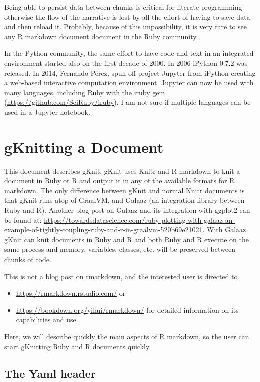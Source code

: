 \documentclass[]{article}
\providecommand{\tightlist}{%
  \setlength{\itemsep}{0pt}\setlength{\parskip}{0pt}}
\begin{document}
Being able to persist data between chunks is critical for literate
programming otherwise the flow of the narrative is lost by all the
effort of having to save data and then reload it. Probably, because of
this impossibility, it is very rare to see any R markdown document
document in the Ruby community.

In the Python community, the same effort to have code and text in an
integrated environment started also on the first decade of 2000. In 2006
iPython 0.7.2 was released. In 2014, Fernando Pérez, spun off project
Jupyter from iPython creating a web-based interactive computation
environment. Jupyter can now be used with many languages, including Ruby
with the iruby gem (\url{https://github.com/SciRuby/iruby}). I am not
sure if multiple languages can be used in a Jupyter notebook.

\section{gKnitting a Document}\label{gknitting-a-document}

This document describes gKnit. gKnit uses Knitr and R markdown to knit a
document in Ruby or R and output it in any of the available formats for
R markdown. The only difference between gKnit and normal Knitr documents
is that gKnit runs atop of GraalVM, and Galaaz (an integration library
between Ruby and R). Another blog post on Galaaz and its integration
with ggplot2 can be found at:
\url{https://towardsdatascience.com/ruby-plotting-with-galaaz-an-example-of-tightly-coupling-ruby-and-r-in-graalvm-520b69e21021}.
With Galaaz, gKnit can knit documents in Ruby and R and both Ruby and R
execute on the same process and memory, variables, classes, etc. will be
preserved between chunks of code.

This is not a blog post on rmarkdown, and the interested user is
directed to

\begin{itemize}
\tightlist
\item
  \url{https://rmarkdown.rstudio.com/} or
\item
  \url{https://bookdown.org/yihui/rmarkdown/} for detailed information
  on its capabilities and use.
\end{itemize}

Here, we will describe quickly the main aspects of R markdown, so the
user can start gKnitting Ruby and R documents quickly.

\subsection{The Yaml header}\label{the-yaml-header}
\end{document}
